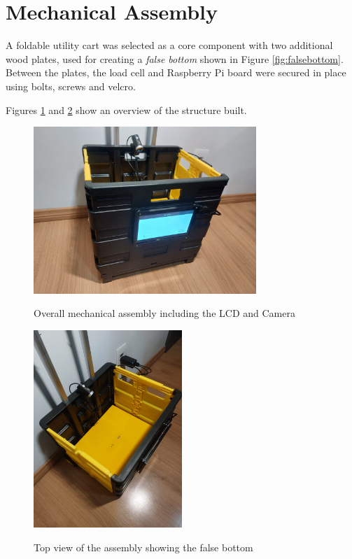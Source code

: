 \section{Mechanical Assembly}

A foldable utility cart was selected as a core
component with two additional wood plates, used for creating a \textit{false
bottom} shown in Figure \ref{fig:falsebottom}. Between the plates, the load cell and Raspberry Pi board were secured
in place using bolts, screws and velcro.

Figures \ref{fig:prototype1} and \ref{fig:prototype2} show an overview of the structure built.

\begin{figure}[H]
	\centering
	\caption[Overall mechanical assembly including the LCD and Camera]{Overall mechanical assembly including the LCD and Camera}
    \includegraphics[width=0.75\textwidth]{./images/cart.jpeg}
	\fonte{}
    \label{fig:prototype1}
\end{figure}

\begin{figure}[H]
	\centering
	\caption[Top view of the assembly showing the false bottom]{Top view of the assembly showing the false bottom}
    \includegraphics[width=0.5\textwidth]{./images/carttop.jpeg}
	\fonte{}
    \label{fig:prototype2}
\end{figure}


